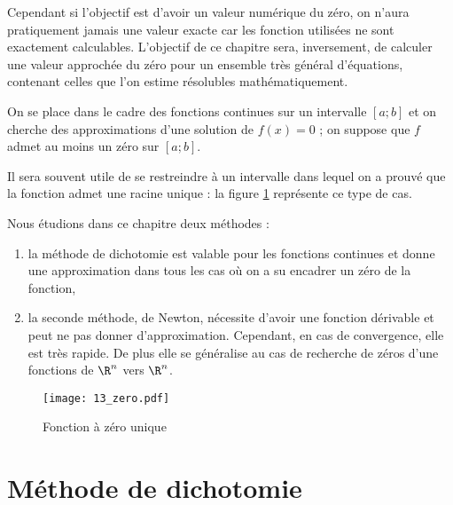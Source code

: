 \medskip

Cependant si l'objectif est d'avoir un valeur numérique du zéro, on n'aura pratiquement jamais une valeur exacte car les fonction utilisées ne sont exactement calculables. L'objectif de ce chapitre sera, inversement, de calculer une valeur approchée du zéro pour un ensemble très général d'équations, contenant celles que l'on estime résolubles mathématiquement.

\medskip

On se place dans le cadre des fonctions continues sur un intervalle $[a;b]$ et on cherche des approximations d'une solution de $f(x)=0$ ; on suppose que $f$ admet au moins un zéro sur $[a;b]$. 

Il sera souvent utile de se restreindre à un intervalle dans lequel on a prouvé que la fonction admet une racine unique : la figure \ref{grf:unZero} représente ce type de cas.

Nous étudions dans ce chapitre deux méthodes :
\begin{enumerate}
  \item la méthode de dichotomie est valable pour les fonctions continues et donne une approximation dans tous les cas où on a su encadrer un zéro de la fonction,
  \item la seconde méthode, de Newton, nécessite d'avoir une fonction dérivable et peut ne pas donner d'approximation. Cependant, en cas de convergence, elle est très rapide. De plus elle se généralise au cas de recherche de zéros d'une fonctions de $\R^n$ vers $\R^n$.
\end{enumerate}
\begin{figure}[ht]
  \begin{center}
      \texttt{[image: 13\_zero.pdf]}
      \caption{\label{grf:unZero} Fonction à zéro unique}
  \end{center}
\end{figure}
\section{Méthode de dichotomie}

